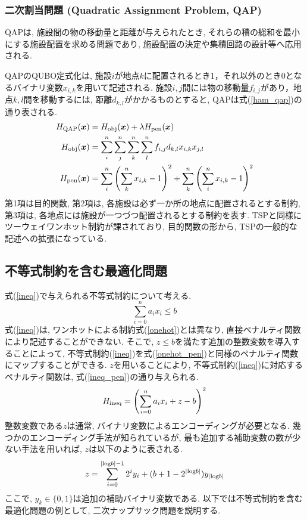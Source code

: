 \documentclass[submit,techrep,noauthor]{ipsj}
\begin{document}
\subsubsection{二次割当問題 (Quadratic Assignment Problem, QAP)}
QAPは, 施設間の物の移動量と距離が与えられたとき, それらの積の総和を最小にする施設配置を求める問題であり, 施設配置の決定や集積回路の設計等へ応用される.

QAPのQUBO定式化は, 施設$i$が地点$k$に配置されるとき1，それ以外のとき0となるバイナリ変数$x_{i,k}$を用いて記述される. 施設$i, j$間には物の移動量$f_{i,j}$があり，地点$k, l$間を移動するには, 距離$d_{k, l}$がかかるものとすると,
 QAPは式(\ref{ham_qap})の通り表される.
 \textcolor{blue}{
\begin{align}
H_{\rm{QAP}}(\bm{x}) &= H_{\rm{obj}}(\bm{x}) + \lambda H_{\rm{pen}}(\bm{x})\nonumber\\
H_{\rm{obj}}(\bm{x}) &= \sum_{i}^{n}\sum_{j}^{n}\sum_{k}^{n}\sum_{l}^{n}f_{i,j}d_{k,l}x_{i,k}x_{j,l}\nonumber\\
H_{\rm{pen}}(\bm{x}) &= \sum_{i}^{n}\left(\sum_{k}^{n}x_{i,k}-1\right)^{2} + \sum_{k}^{n}\left(\sum_{i}^{n}x_{i,k}-1\right)^{2} \label{ham_qap}
\end{align}
}
第1項は目的関数, 第2項は, 各施設は必ず一か所の地点に配置されるとする制約, 第3項は, 各地点には施設が一つづつ配置されるとする制約を表す. TSPと同様にツーウェイワンホット制約が課されており, 目的関数の形から, TSPの一般的な記述への拡張になっている.

\subsection{不等式制約を含む最適化問題}
式(\ref{ineq})で与えられる不等式制約について考える.
\begin{equation}
\sum_{i=0}^{n}a_{i}x_{i}\le b \label{ineq}
\end{equation}
式(\ref{ineq})は, ワンホットによる制約式(\ref{onehot})とは異なり, 直接ペナルティ関数により記述することができない. そこで, $z\le b$を満たす追加の整数変数を導入することによって, 不等式制約(\ref{ineq})を式(\ref{onehot_pen})と同様のペナルティ関数にマップすることができる. $z$を用いることにより, 不等式制約(\ref{ineq})に対応するペナルティ関数は, 式(\ref{ineq_pen})の通り与えられる.
\begin{equation}
H_{\rm{ineq}} = \left(\sum_{i=0}^{n}a_{i}x_{i}+z-b\right)^{2} \label{ineq_pen}
\end{equation}
整数変数である$z$は通常, バイナリ変数によるエンコーディングが必要となる. 幾つかのエンコーディング手法が知られているが, 最も追加する補助変数の数が少ない手法を用いれば, $z$は以下のように表される.
\begin{equation}
z = \sum_{i=0}^{|{\rm{log}}b|-1}2^{i}y_{i}+(b+1-2^{|{\rm{log}}b|})y_{|{\rm{log}}b|}
\end{equation}
ここで, $y_{k}\in \{0, 1\}$は追加の補助バイナリ変数である. 以下では不等式制約を含む最適化問題の例として, 二次ナップサック問題を説明する.
\end{document}
